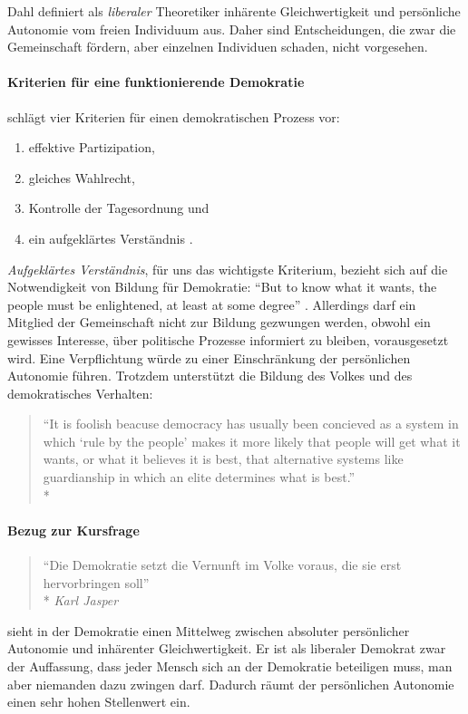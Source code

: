 Dahl definiert als \emph{liberaler} Theoretiker inhärente Gleichwertigkeit und persönliche Autonomie vom freien Individuum aus.
Daher sind Entscheidungen, die zwar die Gemeinschaft fördern, aber einzelnen Individuen schaden, nicht vorgesehen.


\paragraph{Kriterien für eine funktionierende Demokratie}

\citeauthor{Dahl-1989-aa} schlägt vier Kriterien für einen demokratischen Prozess vor:

\begin{enumerate}
	\item effektive Partizipation,
	\item gleiches Wahlrecht,
	\item Kontrolle der Tagesordnung und
	\item ein aufgeklärtes Verständnis \parencite[vgl.][100]{Dahl-1989-aa}.
\end{enumerate}

\emph{Aufgeklärtes Verständnis}, für uns das wichtigste Kriterium, bezieht sich auf die Notwendigkeit von Bildung für Demokratie:
``But to know what it wants, the people must be enlightened, at least at some degree'' \parencite[100]{Dahl-1989-aa}.
Allerdings darf ein Mitglied der Gemeinschaft nicht zur Bildung gezwungen werden, obwohl ein gewisses Interesse, über politische Prozesse informiert zu bleiben, vorausgesetzt wird.
Eine Verpflichtung würde zu einer Einschränkung der persönlichen Autonomie führen.
Trotzdem unterstützt \citeauthor{Dahl-1989-aa} die Bildung des Volkes und des demokratisches Verhalten:

\begin{quote}
	``It is foolish beacuse democracy has usually been concieved as a system in which `rule by the people' makes it more likely that people will get what it wants, or what it believes it is best, that alternative systems like guardianship in which an elite determines what is best.''\\*
	\parencite[111]{Dahl-1989-aa}
\end{quote}


\paragraph{Bezug zur Kursfrage}

\begin{quote}
	``Die Demokratie setzt die Vernunft im Volke voraus, die sie erst hervorbringen soll''\\*
	\emph{Karl Jasper}
\end{quote}

\citeauthor{Dahl-1989-aa} sieht in der Demokratie einen Mittelweg zwischen absoluter persönlicher Autonomie und inhärenter Gleichwertigkeit.
Er ist als liberaler Demokrat zwar der Auffassung, dass jeder Mensch sich an der Demokratie beteiligen muss, man aber niemanden dazu zwingen darf.
Dadurch räumt \citeauthor{Dahl-1989-aa} der persönlichen Autonomie einen sehr hohen Stellenwert ein.